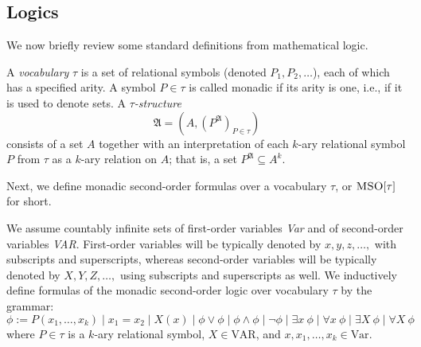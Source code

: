 \documentclass[a4paper,UKenglish,cleveref, autoref, thm-restate]{lipics-v2021}
\newcommand{\MSO}{\textsc{MSO}}
\begin{document}
		\iffalse


\subsection{Logics}

We now brieﬂy review some standard deﬁnitions from mathematical logic.

\begin{samepage}
\begin{definition}
 A {\em vocabulary} $\tau$ is a set of relational symbols (denoted $P_1, P_2, \ldots $), each of which has a specified
 arity. A symbol $P \in \tau$ is called monadic if its arity is one, i.e., if it is used to
 denote sets.
%
A {\em $\tau$-structure} %
%
$$ \mathfrak{A} = (A,	( P^{\mathfrak{A}} )_{P \in \tau})$$
%
consists of a set $A$ together with an interpretation of
 each $k$-ary relational symbol $P$ from $\tau$ as a $k$-ary relation on $A$; that is, a
set $P^{\mathfrak{A}} \subseteq A^k$.
%
\end{definition}
\end{samepage}







Next, we deﬁne monadic second-order formulas over a vocabulary $\tau$, or $\MSO[\tau]$ for short. %

\begin{samepage}
\begin{definition}\label{MSO}
We assume countably infinite sets of first-order variables {\em Var}
and of second-order variables {\em VAR}. First-order variables
will be typically denoted by $x, y, z, \ldots,$ with subscripts and superscripts,
whereas second-order variables will be typically denoted by $X, Y, Z, \ldots ,$
using subscripts and superscripts as well. We
inductively define %
formulas of the monadic second-order logic
over vocabulary $\tau$ %
by the grammar:
$$ \phi :=  P(x_1 , \ldots , x_k) \mid x_1 = x_2 \mid X(x) 
		\mid \phi \vee \phi \mid \phi \wedge \phi \mid \neg \phi 
		\mid \exists x ~ \phi \mid  \forall x ~ \phi
		\mid \exists X ~ \phi \mid  \forall X ~ \phi		$$
where $P \in \tau$ is a $k$-ary relational symbol, $X \in \text{VAR}$, and $x, x_1, \ldots, x_k \in \text{Var}$.
\end{definition}
\end{samepage}
\end{document}
